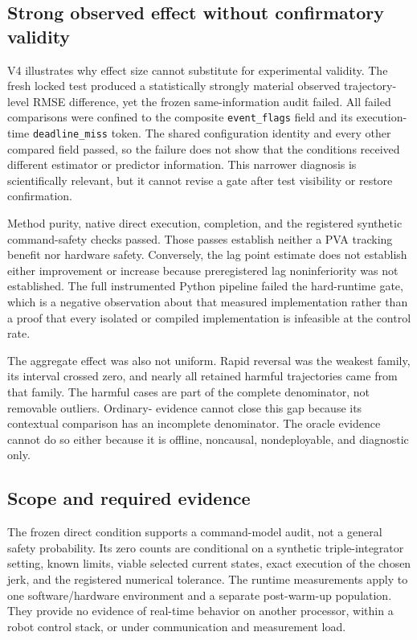 \subsection{Strong observed effect without confirmatory validity}
\label{sec:v4-discussion}

V4 illustrates why effect size cannot substitute for experimental validity.
The fresh locked test produced a statistically strongly material observed
trajectory-level RMSE difference, yet the frozen same-information audit
failed.  All failed comparisons were confined to the composite
\texttt{event\_flags} field and its execution-time
\texttt{deadline\_miss} token.  The shared configuration identity and every
other compared field passed, so the failure does not show that the conditions
received different estimator or predictor information.  This narrower
diagnosis is scientifically relevant, but it cannot revise a gate after test
visibility or restore confirmation.

Method purity, native direct execution, completion, and the registered
synthetic command-safety checks passed.  Those passes establish neither a PVA
tracking benefit nor hardware safety.  Conversely, the lag point estimate
does not establish either improvement or increase because preregistered lag
noninferiority was not established.  The full instrumented Python pipeline
failed the hard-runtime gate, which is a negative observation about that
measured implementation rather than a proof that every isolated or compiled
implementation is infeasible at the control rate.

The aggregate effect was also not uniform.  Rapid reversal was the weakest
family, its interval crossed zero, and nearly all retained harmful
trajectories came from that family.  The harmful cases are part of the
complete denominator, not removable outliers.  Ordinary-\Ruckig{} evidence
cannot close this gap because its contextual comparison has an incomplete
denominator.  The oracle evidence cannot do so either because it is offline,
noncausal, nondeployable, and diagnostic only.

\subsection{Scope and required evidence}

The frozen direct condition supports a command-model audit, not a general
safety probability.  Its zero counts are conditional on a synthetic
triple-integrator setting, known limits, viable selected current states, exact
execution of the chosen jerk, and the registered numerical tolerance.  The
runtime measurements apply to one software/hardware environment and a
separate post-warm-up population.  They provide no evidence of real-time behavior on
another processor, within a robot control stack, or under communication and
measurement load.

